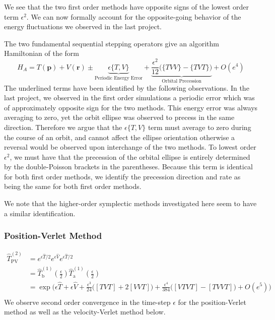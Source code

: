 \documentclass[8pt,a4paper]{article}
\begin{document}
	We see that the two first order methods have opposite signs of the lowest order term $\epsilon^2$. We can now formally account for the opposite-going behavior of the energy fluctuations we observed in the last project.
	
	The two fundamental sequential stepping operators give an algorithm Hamiltonian of the form
	\begin{equation}
		H_A = T(\mathbf{p}) + V(\mathbf{r}) \pm \underbrace{\epsilon\{T,V\}}_{\text{Periodic Energy Error}} + \underbrace{\frac{\epsilon^2}{12}\Big(\{TVV\} - \{TVT\}\Big)}_{\text{Orbital Precession}}  + O(e^4)
	\end{equation}
	The underlined terms have been identified by the following observations. In the last project, we observed in the first order simulations a periodic error which was of approximately opposite sign for the two methods. This energy error was always averaging to zero, yet the orbit ellipse was observed to precess in the same direction. Therefore we argue that the $\epsilon\{T,V\}$ term must average to zero during the course of an orbit, and cannot affect the ellipse orientation otherwise a reversal would be observed upon interchange of the two methods. To lowest order $\epsilon^2$, we must have that the precession of the orbital ellipse is entirely determined by the double-Poisson brackets in the parentheses. Because this term is identical for both first order methods, we identify the precession direction and rate as being the same for both first order methods.
	
	We note that the higher-order symplectic methods investigated here seem to have a similar identification.
	\subsubsection{Position-Verlet Method}
	\begin{align}
		\hat{T}^{(2)}_\mathrm{PV}	&= e^{\epsilon \hat{T}/2}e^{\epsilon \hat{V}} e^{\epsilon \hat{T}/2} \\
		&= \hat{T}^{(1)}_\mathrm{b}\left(\frac{\epsilon}{2}\right) \hat{T}^{(1)}_\mathrm{a}\left(\frac{\epsilon}{2}\right) \\
		&= \exp\Bigg(\epsilon\hat{T} + \epsilon\hat{V} + \frac{\epsilon^3}{24}\Big([TVT] + 2[VVT]\Big) + \frac{\epsilon^4}{384}\Big([VTVT] - [TVVT]\Big) + O(e^5) \Bigg) \\
	\end{align}
	We observe second order convergence in the time-step $\epsilon$ for the position-Verlet method as well as the velocity-Verlet method below.
\end{document}
